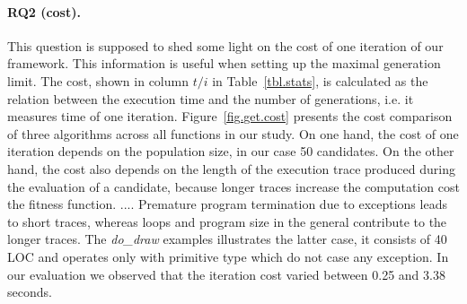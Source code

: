 \documentclass[sigconf,review, anonymous]{acmart}
\begin{document}
\paragraph{\textbf{RQ2 (cost).}} This question is supposed to shed some light on the cost of one iteration of our framework. This information is useful when setting up the maximal generation limit. The cost, shown in column $t/i$ in Table~\ref{tbl.stats}, is calculated as the relation between the execution time and the number of generations, i.e. it measures time of one iteration. Figure~\ref{fig.get.cost} presents the cost comparison of three algorithms across all functions in our study. On one hand, the cost of one iteration depends on the population size, in our case 50 candidates. On the other hand, the cost also depends on the length of the execution trace produced during the evaluation of a candidate, because longer traces increase the computation cost the fitness function. 
....
Premature program termination due to exceptions leads to short traces, whereas loops and program size in the general contribute to the longer traces. The \emph{do_draw} examples illustrates the latter case, it consists of 40 LOC and operates only with primitive type which do not case any exception. In our evaluation we observed that the iteration cost varied between 0.25 and 3.38 seconds. 
\end{document}
